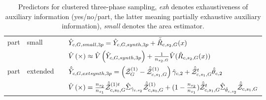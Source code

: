 \begin{table}
\begin{tabular}{ l l r l}
 	 part 	&  small 	& \analogy{} & $ \hat{Y}_{c,G,small,3p} = \hat{Y}_{c,G,synth,3p} + \bar{\hat{R}}_{c,s_2,G}(x)$\\
	    	&      	& \analogy{} & $ \hat{V}\left(\times\right) \approx \hat{V}\left(\hat{Y}_{c,G,synth,3p}\right) + \frac{1}{n_{s_2,G}}\hat{V}(\hat{R}_{c,s_2,G}(x))$\\
\lightrule

	 part 	&  extended 	& \analogy{} & $\hat{\tilde{Y}}_{c,G,ext
synth,3p} = \left( \bar{\mathcal{Z}}_{G}^{(1)}- \hat{\bar{\mathcal{Z}}}_{c,s_1,G}^{(1)}\right) \hat{\gamma}_{c,2} + \hat{\bar{\mathcal{Z}}}^t_{c,s_1,G}\hat{\theta}_{c,2} $\\
	   	&    	&    \analogy{} & $ \hat{V}\left(\times\right) = \frac{n_{s_2}}{n_{s_1}} \hat{\bar{\mathcal{Z}}}^{(1)t}_{c,s_0,G} \hat{\Sigma}_{ \hat{\gamma}_{c,s_2}} \hat{\bar{\mathcal{Z}}}^{(1)}_{c,s_0,G} + (1-\frac{n_{s_2}}{n_{s_1}})\hat{\bar{\mathcal{Z}}}^{t}_{c,s_1,G} \hat{\Sigma}_{ \hat{\theta}_{c,s_2}} \hat{\bar{\mathcal{Z}}}_{c,s_1,G}$\\

\end{tabular}
\caption{Predictors for clustered three-phase sampling, 
    \emph{exh} denotes exhaustiveness of auxiliary information (yes/no/part, the
    latter meaning partially exhaustive auxiliary information),
    \emph{small} denotes the area estimator. \label{tab:clustered3}
}

\end{table}

